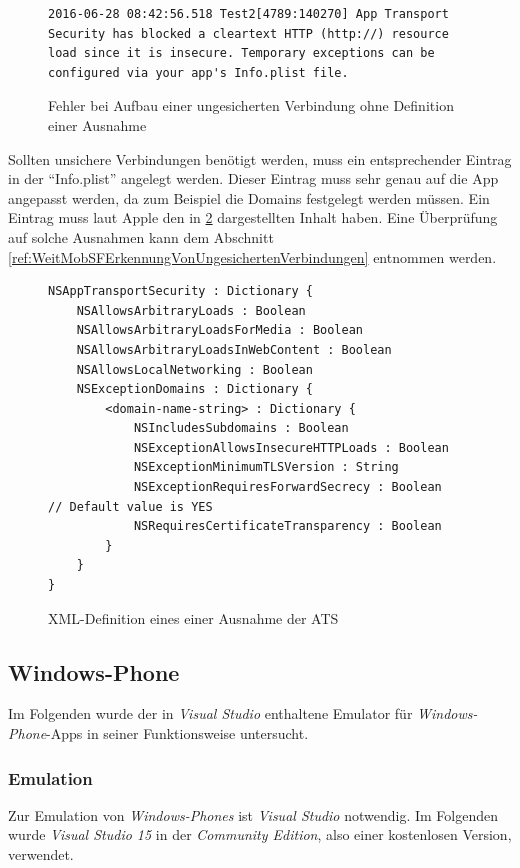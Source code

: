 \begin{figure}[p]
\begin{lstlisting}
2016-06-28 08:42:56.518 Test2[4789:140270] App Transport Security has blocked a cleartext HTTP (http://) resource load since it is insecure. Temporary exceptions can be configured via your app's Info.plist file.
\end{lstlisting}
\caption{Fehler bei Aufbau einer ungesicherten Verbindung ohne Definition einer Ausnahme}
\label{lst:VergliOSTLSFehler}
\end{figure}

Sollten unsichere Verbindungen benötigt werden, muss ein entsprechender Eintrag in der "`Info.plist"' angelegt werden. Dieser Eintrag muss sehr genau auf die App angepasst werden, da zum Beispiel die Domains festgelegt werden müssen. Ein Eintrag muss laut Apple\cite{AppleNSAppTransportSecurity} den in \ref{lst:VergliOSATSAus} dargestellten Inhalt haben. Eine Überprüfung auf solche Ausnahmen kann dem Abschnitt \ref{ref:WeitMobSFErkennungVonUngesichertenVerbindungen} entnommen werden.

\begin{figure}
\begin{lstlisting}
NSAppTransportSecurity : Dictionary {
    NSAllowsArbitraryLoads : Boolean
    NSAllowsArbitraryLoadsForMedia : Boolean
    NSAllowsArbitraryLoadsInWebContent : Boolean
    NSAllowsLocalNetworking : Boolean
    NSExceptionDomains : Dictionary {
        <domain-name-string> : Dictionary {
            NSIncludesSubdomains : Boolean
            NSExceptionAllowsInsecureHTTPLoads : Boolean
            NSExceptionMinimumTLSVersion : String
            NSExceptionRequiresForwardSecrecy : Boolean   // Default value is YES
            NSRequiresCertificateTransparency : Boolean
        }
    }
}
\end{lstlisting}
\caption{XML-Definition eines einer Ausnahme der ATS}
\label{lst:VergliOSATSAus}
\end{figure}

		\subsection{Windows-Phone}
		Im Folgenden wurde der in \textit{Visual Studio} enthaltene Emulator für \textit{Windows-Phone}-Apps in seiner Funktionsweise untersucht.
		
			\subsubsection{Emulation}
			Zur Emulation von \textit{Windows-Phones} ist \textit{Visual Studio} notwendig. Im Folgenden wurde \textit{Visual Studio 15} in der \textit{Community Edition}, also einer kostenlosen Version, verwendet.\\
			
